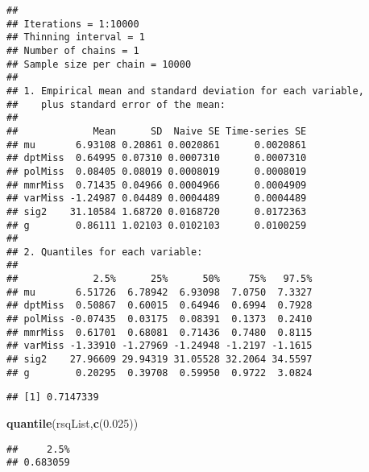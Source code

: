 \documentclass[]{article}
\newenvironment{Shaded}{\begin{snugshade}}{\end{snugshade}}
\newcommand{\DecValTok}[1]{\textcolor[rgb]{0.00,0.00,0.81}{#1}}
\newcommand{\FloatTok}[1]{\textcolor[rgb]{0.00,0.00,0.81}{#1}}
\newcommand{\KeywordTok}[1]{\textcolor[rgb]{0.13,0.29,0.53}{\textbf{#1}}}
\newcommand{\NormalTok}[1]{#1}
\newcommand{\OperatorTok}[1]{\textcolor[rgb]{0.81,0.36,0.00}{\textbf{#1}}}
\newcommand{\StringTok}[1]{\textcolor[rgb]{0.31,0.60,0.02}{#1}}
\begin{document}
\begin{verbatim}
## 
## Iterations = 1:10000
## Thinning interval = 1 
## Number of chains = 1 
## Sample size per chain = 10000 
## 
## 1. Empirical mean and standard deviation for each variable,
##    plus standard error of the mean:
## 
##             Mean      SD  Naive SE Time-series SE
## mu       6.93108 0.20861 0.0020861      0.0020861
## dptMiss  0.64995 0.07310 0.0007310      0.0007310
## polMiss  0.08405 0.08019 0.0008019      0.0008019
## mmrMiss  0.71435 0.04966 0.0004966      0.0004909
## varMiss -1.24987 0.04489 0.0004489      0.0004489
## sig2    31.10584 1.68720 0.0168720      0.0172363
## g        0.86111 1.02103 0.0102103      0.0100259
## 
## 2. Quantiles for each variable:
## 
##             2.5%      25%      50%     75%   97.5%
## mu       6.51726  6.78942  6.93098  7.0750  7.3327
## dptMiss  0.50867  0.60015  0.64946  0.6994  0.7928
## polMiss -0.07435  0.03175  0.08391  0.1373  0.2410
## mmrMiss  0.61701  0.68081  0.71436  0.7480  0.8115
## varMiss -1.33910 -1.27969 -1.24948 -1.2197 -1.1615
## sig2    27.96609 29.94319 31.05528 32.2064 34.5597
## g        0.20295  0.39708  0.59950  0.9722  3.0824
\end{verbatim}

\begin{Shaded}
\end{Shaded}

\begin{verbatim}
## [1] 0.7147339
\end{verbatim}

\begin{Shaded}
\begin{Highlighting}[]
\KeywordTok{quantile}\NormalTok{(rsqList,}\KeywordTok{c}\NormalTok{(}\FloatTok{0.025}\NormalTok{))}
\end{Highlighting}
\end{Shaded}

\begin{verbatim}
##     2.5% 
## 0.683059
\end{verbatim}
\end{document}

